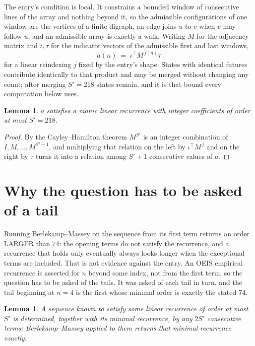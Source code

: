 \documentclass[11pt,a4paper]{article}
\theoremstyle{plain}
\newtheorem{lemma}[theorem]{Lemma}
\theoremstyle{definition}
\begin{document}
The entry's condition is local. It constrains a bounded window of consecutive lines of the
array and nothing beyond it, so the admissible configurations of one window are the vertices of
a finite digraph, an edge joins $u$ to $v$ when $v$ may follow $u$, and an admissible array is
exactly a walk. Writing $M$ for the adjacency matrix and $\iota,\tau$ for the indicator vectors
of the admissible first and last windows,
\[
a(n)\;=\;\iota^{\!\top}M^{\,j(n)}\tau
\]
for a linear reindexing $j$ fixed by the entry's shape. States with identical futures
contribute identically to that product and may be merged without changing any count; after
merging $S'=218$ states remain, and it is that bound every computation below uses.

\begin{lemma}\label{lem:cf}
$a$ satisfies a monic linear recurrence with integer coefficients of order at most $S'=218$.
\end{lemma}

\begin{proof}
By the Cayley--Hamilton theorem $M^{S'}$ is an integer combination of $I,M,\dots,M^{S'-1}$,
and multiplying that relation on the left by $\iota^{\!\top}M^{\,j}$ and on the right by
$\tau$ turns it into a relation among $S'+1$ consecutive values of $a$.
\end{proof}

\section{Why the question has to be asked of a tail}

Running Berlekamp--Massey on the sequence from its first term returns an order LARGER than $74$: the opening terms do not satisfy the recurrence, and a recurrence that holds only eventually always looks longer when the exceptional terms are included. That is not evidence against the entry. An OEIS empirical recurrence is asserted for $n$ beyond some index, not from the first term, so the question has to be asked of the tails. It was asked of each tail in turn, and the tail beginning at $n=4$ is the first whose minimal order is exactly the stated $74$.

\begin{lemma}\label{lem:bm}
A sequence known to satisfy some linear recurrence of order at most $S'$ is determined,
together with its minimal recurrence, by any $2S'$ consecutive terms: Berlekamp--Massey applied
to them returns that minimal recurrence exactly.
\end{lemma}
\end{document}
